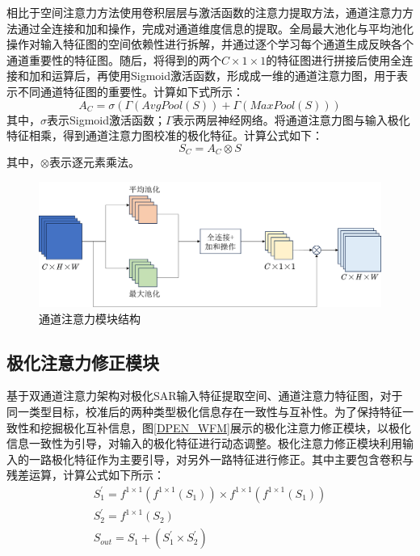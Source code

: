 相比于空间注意力方法使用卷积层层与激活函数的注意力提取方法，通道注意力方法通过全连接和加和操作，完成对通道维度信息的提取。全局最大池化与平均池化操作对输入特征图的空间依赖性进行拆解，并通过逐个学习每个通道生成反映各个通道重要性的特征图。随后，将得到的两个$C\times 1 \times 1$的特征图进行拼接后使用全连接和加和运算后，再使用Sigmoid激活函数，形成成一维的通道注意力图，用于表示不同通道特征图的重要性。计算如下式所示：
\begin{equation}
    A_C=\sigma(\Gamma(AvgPool(S))+\Gamma(MaxPool(S)))
\end{equation}
其中，$\sigma$表示Sigmoid激活函数；$\Gamma$表示两层神经网络。将通道注意力图与输入极化特征相乘，得到通道注意力图校准的极化特征。计算公式如下：
\begin{equation}
    S_C=A_C \otimes S
\end{equation}
其中，$\otimes$表示逐元素乘法。

\begin{figure}[ht!]
    \centering
    \includegraphics[width=14cm]{pic/chapter3/Channel.png}
    \caption{通道注意力模块结构}
    \label{fig:channel}
\end{figure}


\subsection{极化注意力修正模块}
\label{sec:极化注意力修正模块}
基于双通道注意力架构对极化SAR输入特征提取空间、通道注意力特征图，对于同一类型目标，校准后的两种类型极化信息存在一致性与互补性。为了保持特征一致性和挖掘极化互补信息，图\ref{DPEN_WFM}展示的极化注意力修正模块，以极化信息一致性为引导，对输入的极化特征进行动态调整。极化注意力修正模块利用输入的一路极化特征作为主要引导，对另外一路特征进行修正。其中主要包含卷积与残差运算，计算公式如下所示：
\begin{gather}
    S_{1}^{\prime}=f^{1\times 1}\left( f^{1\times 1}\left( S_1 \right) \right) \times f^{1\times 1}\left( f^{1\times 1}\left( S_1 \right) \right)
    \\
    S_{2}^{\prime}=f^{1\times 1}\left( S_2 \right)
    \\
    S_{out}=S_1+\left( S_{1}^{\prime}\times S_{2}^{\prime} \right)
\end{gather}

